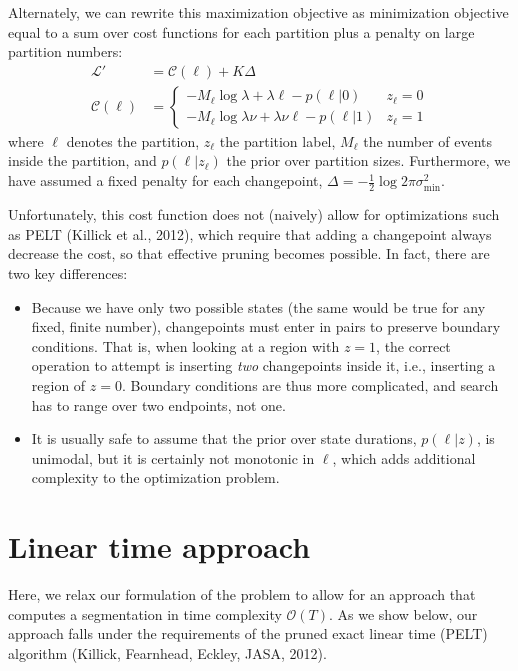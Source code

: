 \documentclass[11pt]{article}
\begin{document}
Alternately, we can rewrite this maximization objective as minimization objective equal to a sum over cost functions for each partition plus a penalty on large partition numbers:
\begin{align}
    \mathcal{L}' &= \mathcal{C}(\ell) + K \Delta \\
    \mathcal{C}(\ell) &=
    \begin{cases}
        -M_\ell \log \lambda + \lambda \ell - p(\ell|0) & z_\ell = 0 \\
        -M_\ell \log \lambda\nu + \lambda\nu \ell - p(\ell|1) & z_\ell = 1
    \end{cases}
\end{align}
where $\ell$ denotes the partition, $z_\ell$ the partition label, $M_\ell$ the number of events inside the partition, and $p(\ell|z_\ell)$ the prior over partition sizes. Furthermore, we have assumed a fixed penalty for each changepoint, $\Delta = -\frac{1}{2}\log 2\pi \sigma^2_\mathrm{min}$.

Unfortunately, this cost function does not (naively) allow for optimizations such as PELT (Killick et al., 2012), which require that adding a changepoint always decrease the cost, so that effective pruning becomes possible. In fact, there are two key differences:
\begin{itemize}
    \item Because we have only two possible states (the same would be true for any fixed, finite number), changepoints must enter in pairs to preserve boundary conditions. That is, when looking at a region with $z = 1$, the correct operation to attempt is inserting \emph{two} changepoints inside it, i.e., inserting a region of $z = 0$. Boundary conditions are thus more complicated, and search has to range over two endpoints, not one.

    \item It is usually safe to assume that the prior over state durations, $p(\ell|z)$, is unimodal, but it is certainly not monotonic in $\ell$, which adds additional complexity to the optimization problem.
\end{itemize}

\section{Linear time approach}
Here, we relax our formulation of the problem to allow for an approach that computes a segmentation in time complexity $\mathcal{O}(T)$. As we show below, our approach falls under the requirements of the pruned exact linear time (PELT) algorithm (Killick, Fearnhead, Eckley, JASA, 2012).
\end{document}
